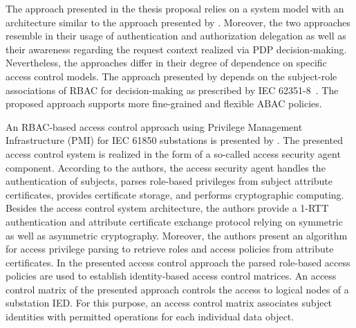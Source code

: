 The approach presented in the thesis proposal relies on a system model with an architecture similar to the approach presented by \citeauthor{Alcaraz2016}.
Moreover, the two approaches resemble in their usage of authentication and authorization delegation as well as their awareness regarding the request context realized via PDP decision-making.
Nevertheless, the approaches differ in their degree of dependence on specific access control models.
The approach presented by \citeauthor{Alcaraz2016} depends on the subject-role associations of RBAC for decision-making as prescribed by IEC 62351-8~\cite{IEC62351P8}.
The proposed approach supports more fine-grained and flexible ABAC policies.

An RBAC-based access control approach using Privilege Management Infrastructure (PMI) for IEC 61850 substations is presented by \citeauthor{Liu2006} \cite{Liu2006}.
The presented access control system is realized in the form of a so-called access security agent component.
According to the authors, the access security agent handles the authentication of subjects, parses role-based privileges from subject attribute certificates, provides certificate storage, and performs cryptographic computing.
Besides the access control system architecture, the authors provide a 1-RTT authentication and attribute certificate exchange protocol relying on symmetric as well as asymmetric cryptography.
Moreover, the authors present an algorithm for access privilege parsing to retrieve roles and access policies from attribute certificates.
In the presented access control approach the parsed role-based access policies are used to establish identity-based access control matrices.
An access control matrix of the presented approach controls the access to logical nodes of a substation IED.
For this purpose, an access control matrix associates subject identities with permitted operations for each individual data object.

